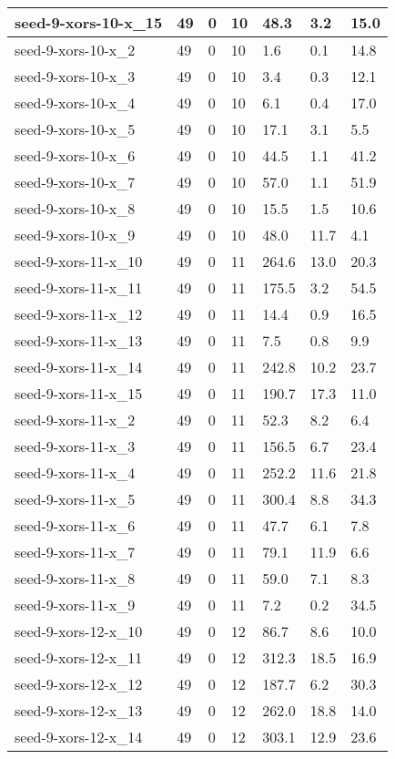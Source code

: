 \begin{scriptsize}
\begin{longtable}{|p{5cm}|l|l|l|l|l|l|}
seed-9-xors-10-x\_15&49&0&10&48.3&3.2&15.0 \\ \hline 
seed-9-xors-10-x\_2&49&0&10&1.6&0.1&14.8 \\ \hline 
seed-9-xors-10-x\_3&49&0&10&3.4&0.3&12.1 \\ \hline 
seed-9-xors-10-x\_4&49&0&10&6.1&0.4&17.0 \\ \hline 
seed-9-xors-10-x\_5&49&0&10&17.1&3.1&5.5 \\ \hline 
seed-9-xors-10-x\_6&49&0&10&44.5&1.1&41.2 \\ \hline 
seed-9-xors-10-x\_7&49&0&10&57.0&1.1&51.9 \\ \hline 
seed-9-xors-10-x\_8&49&0&10&15.5&1.5&10.6 \\ \hline 
seed-9-xors-10-x\_9&49&0&10&48.0&11.7&4.1 \\ \hline 
seed-9-xors-11-x\_10&49&0&11&264.6&13.0&20.3 \\ \hline 
seed-9-xors-11-x\_11&49&0&11&175.5&3.2&54.5 \\ \hline 
seed-9-xors-11-x\_12&49&0&11&14.4&0.9&16.5 \\ \hline 
seed-9-xors-11-x\_13&49&0&11&7.5&0.8&9.9 \\ \hline 
seed-9-xors-11-x\_14&49&0&11&242.8&10.2&23.7 \\ \hline 
seed-9-xors-11-x\_15&49&0&11&190.7&17.3&11.0 \\ \hline 
seed-9-xors-11-x\_2&49&0&11&52.3&8.2&6.4 \\ \hline 
seed-9-xors-11-x\_3&49&0&11&156.5&6.7&23.4 \\ \hline 
seed-9-xors-11-x\_4&49&0&11&252.2&11.6&21.8 \\ \hline 
seed-9-xors-11-x\_5&49&0&11&300.4&8.8&34.3 \\ \hline 
seed-9-xors-11-x\_6&49&0&11&47.7&6.1&7.8 \\ \hline 
seed-9-xors-11-x\_7&49&0&11&79.1&11.9&6.6 \\ \hline 
seed-9-xors-11-x\_8&49&0&11&59.0&7.1&8.3 \\ \hline 
seed-9-xors-11-x\_9&49&0&11&7.2&0.2&34.5 \\ \hline 
seed-9-xors-12-x\_10&49&0&12&86.7&8.6&10.0 \\ \hline 
seed-9-xors-12-x\_11&49&0&12&312.3&18.5&16.9 \\ \hline 
seed-9-xors-12-x\_12&49&0&12&187.7&6.2&30.3 \\ \hline 
seed-9-xors-12-x\_13&49&0&12&262.0&18.8&14.0 \\ \hline 
seed-9-xors-12-x\_14&49&0&12&303.1&12.9&23.6 \\ \hline 

\end{longtable}
\end{scriptsize}
